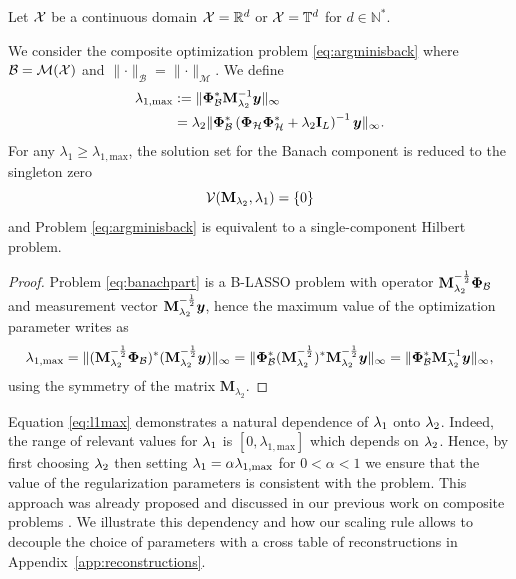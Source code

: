 \documentclass[12pt]{article}
\begin{document}
    \begin{proposition}
    \label{prop:lmax}
    Let $\mathcal{X}$ be a continuous domain $\mathcal{X}=\mathbb{R}^d$ or $\mathcal{X}=\mathbb{T}^d$ for $d \in \mathbb{N}^*$.

    We consider the composite optimization problem \eqref{eq:argminisback} where $\mathcal{B} = \mathcal{M}(\mathcal{X})$ and $\lVert \cdot \rVert_\mathcal{B} = \lVert \cdot \rVert_\mathcal{M}$. We define
    \begin{equation}
        \label{eq:l1max}
        \begin{split}
        \lambda_{1, \mathrm{max}} &:= \lVert \bm{\Phi}_\mathcal{B}^* \mathbf{M}_{\lambda_2}^{-1} \bm{y} \rVert_\infty \\
                & = \lambda_2 \lVert \bm{\Phi}_\mathcal{B}^* \left( \bm{\Phi}_\mathcal{H} \bm{\Phi}_\mathcal{H}^* + \lambda_2 \mathbf{I}_L \right)^{-1} \bm{y} \rVert_\infty.
        \end{split}
    \end{equation}
    For any $\lambda_1 \geq \lambda_{1, \mathrm{max}}$, the solution set for the Banach component is reduced to the singleton zero 
    $$\mathcal{V}(\mathbf{M}_{\lambda_{2}}, \lambda_{1}) = \left\{ 0 \right\}$$
    and Problem \eqref{eq:argminisback} is equivalent to a single-component Hilbert problem.
    \end{proposition}

    \begin{proof}
        Problem \eqref{eq:banachpart} is a B-LASSO problem with operator $\mathbf{M}_{\lambda_{2}}^{-\frac{1}{2}} \bm{\Phi}_\mathcal{B}$ and measurement vector $\mathbf{M}_{\lambda_{2}}^{-\frac{1}{2}}\bm{y}$, hence the maximum value of the optimization parameter writes as
        \begin{equation*}
            \lambda_{1, \mathrm{max}} = \lVert (\mathbf{M}_{\lambda_{2}}^{-\frac{1}{2}} \bm{\Phi}_\mathcal{B})^*  (\mathbf{M}_{\lambda_{2}}^{-\frac{1}{2}} \bm{y}) \rVert_\infty = \lVert \bm{\Phi}_\mathcal{B}^* (\mathbf{M}_{\lambda_{2}}^{-\frac{1}{2}})^* \mathbf{M}_{\lambda_{2}}^{-\frac{1}{2}} \bm{y} \rVert_\infty = \lVert \bm{\Phi}_\mathcal{B}^* \mathbf{M}_{\lambda_2}^{-1} \bm{y} \rVert_\infty,
        \end{equation*}
        using the symmetry of the matrix $\mathbf{M}_{\lambda_2}$.
    \end{proof}

    Equation \eqref{eq:l1max} demonstrates a natural dependence of $\lambda_{1}$ onto $\lambda_{2}$. Indeed, the range of relevant values for $\lambda_{1}$ is $[0, \lambda_{1, \mathrm{max}}]$ which depends on $\lambda_{2}$. Hence, by first choosing $\lambda_{2}$ then setting $\lambda_{1} = \alpha \lambda_{1, \mathrm{max}}$ for $0 < \alpha < 1$ we ensure that the value of the regularization parameters is consistent with the problem. This approach was already proposed and discussed in our previous work on composite problems \cite{jarret2024decoupled}. We illustrate this dependency and how our scaling rule allows to decouple the choice of parameters with a cross table of reconstructions in Appendix~\ref{app:reconstructions}.
\end{document}
